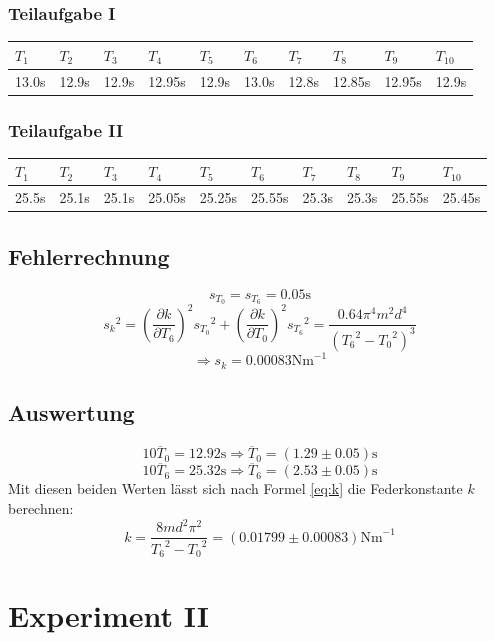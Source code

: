 \documentclass[12pt,a4paper]{article}
\begin{document}
\subsubsection*{Teilaufgabe I}
\begin{tabular}{|l|l|l|l|l|l|l|l|l|l|}
\hline
$T_{1}$&$T_{2}$&$T_{3}$&$T_{4}$&$T_{5}$&$T_{6}$&$T_{7}$&$T_{8}$&$T_{9}$&$T_{10}$\\
\hline
13.0s&12.9s&12.9s&12.95s&12.9s&13.0s&12.8s&12.85s&12.95s&12.9s\\
\hline
\end{tabular}

\subsubsection*{Teilaufgabe II}
\begin{tabular}{|l|l|l|l|l|l|l|l|l|l|}
\hline
$T_{1}$&$T_{2}$&$T_{3}$&$T_{4}$&$T_{5}$&$T_{6}$&$T_{7}$&$T_{8}$&$T_{9}$&$T_{10}$\\
\hline
25.5s&25.1s&25.1s&25.05s&25.25s&25.55s&25.3s&25.3s&25.55s&25.45s\\
\hline
\end{tabular}

\subsection*{Fehlerrechnung}
\[ s_{T_0} = s_{T_6} = 0.05\mbox{s} \]
\[ {s_k}^2 = \left( \frac{\partial k}{\partial T_6} \right)^2 {s_{T_0}}^2 + \left( \frac{\partial k}{\partial T_0} \right)^2 {s_{T_6}}^2 = \frac{0.64\pi^4m^2d^4}{({T_6}^2-{T_0}^2)^3} \]
\[ \Rightarrow s_k = 0.00083\mbox{Nm}^{-1} \]

\subsection*{Auswertung}
\[ 10\overline{T}_0 = 12.92\mbox{s} \Rightarrow \overline{T}_0 = (1.29 \pm 0.05) \mbox{s} \]
\[ 10\overline{T}_6 = 25.32\mbox{s} \Rightarrow \overline{T}_6 = (2.53 \pm 0.05) \mbox{s} \]
Mit diesen beiden Werten l\"asst sich nach Formel \ref{eq:k} die Federkonstante $k$ berechnen:
\[ k = \frac{8md^2\pi^2}{{T_6}^2 - {T_0}^2} = (0.01799 \pm 0.00083) \mbox{Nm}^{-1} \]

\newpage
\section*{Experiment II}
\end{document}
